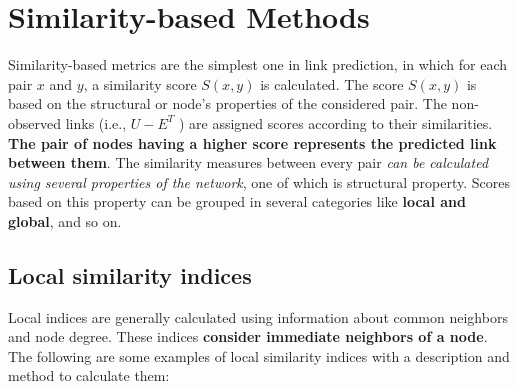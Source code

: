 \section{Similarity-based Methods}

Similarity-based metrics are the simplest one in link prediction, in
which for each pair \(x\) and \(y\), a similarity score \(S(x, y)\) is
calculated. The score \(S(x, y)\) is based on the structural or node's
properties of the considered pair. The non-observed links (i.e.,
\(U - E^T\) ) are assigned scores according to their similarities.
\textbf{The pair of nodes having a higher score represents the predicted
    link between them}. The similarity measures between every pair \emph{can
    be calculated using several properties of the network}, one of which is
structural property. Scores based on this property can be grouped in
several categories like \textbf{local and global}, and so on.

\subsection{Local similarity indices}

Local indices are generally calculated using information about common
neighbors and node degree. These indices \textbf{consider immediate
    neighbors of a node}. The following are some examples of local
similarity indices with a description and method to calculate them:

